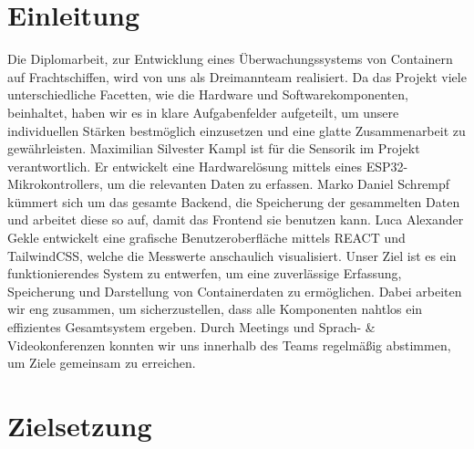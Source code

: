 \documentclass[
    headings=optiontotocandhead,%
    twoside,
    numbers=noenddot,%
    12pt, %
    titlepage, %
    parskip=full, %
    listof=leveldown, 
    numbers=noenddot, %
    a4paper,DIV=14,
    BCOR=15mm,
]{scrbook}
\makeatletter
\newcommand*{\the@orig@section}{}
\let\the@orig@section\section
\renewcommand*{\section}{%
  \clearpage
  \the@orig@section
}
\makeatother
\begin{document}


\cleardoublepage{}
\setcounter{tocdepth}{3}
\tableofcontents{}

\raggedbottom
\cleardoublepage{}
\mainmatter
\hypertarget{einleitung}{%
\section{Einleitung}\label{einleitung}}

Die Diplomarbeit, zur Entwicklung eines Überwachungssystems von
Containern auf Frachtschiffen, wird von uns als Dreimannteam realisiert.
Da das Projekt viele unterschiedliche Facetten, wie die Hardware und
Softwarekomponenten, beinhaltet, haben wir es in klare Aufgabenfelder
aufgeteilt, um unsere individuellen Stärken bestmöglich einzusetzen und
eine glatte Zusammenarbeit zu gewährleisten. Maximilian Silvester Kampl
ist für die Sensorik im Projekt verantwortlich. Er entwickelt eine
Hardwarelösung mittels eines ESP32-Mikrokontrollers, um die relevanten
Daten zu erfassen. Marko Daniel Schrempf kümmert sich um das gesamte
Backend, die Speicherung der gesammelten Daten und arbeitet diese so
auf, damit das Frontend sie benutzen kann. Luca Alexander Gekle
entwickelt eine grafische Benutzeroberfläche mittels REACT und
TailwindCSS, welche die Messwerte anschaulich visualisiert. Unser Ziel
ist es ein funktionierendes System zu entwerfen, um eine zuverlässige
Erfassung, Speicherung und Darstellung von Containerdaten zu
ermöglichen. Dabei arbeiten wir eng zusammen, um sicherzustellen, dass
alle Komponenten nahtlos ein effizientes Gesamtsystem ergeben. Durch
Meetings und Sprach- \& Videokonferenzen konnten wir uns innerhalb des
Teams regelmäßig abstimmen, um Ziele gemeinsam zu erreichen.

\hypertarget{zielsetzung}{%
\section{Zielsetzung}\label{zielsetzung}}
\end{document}
